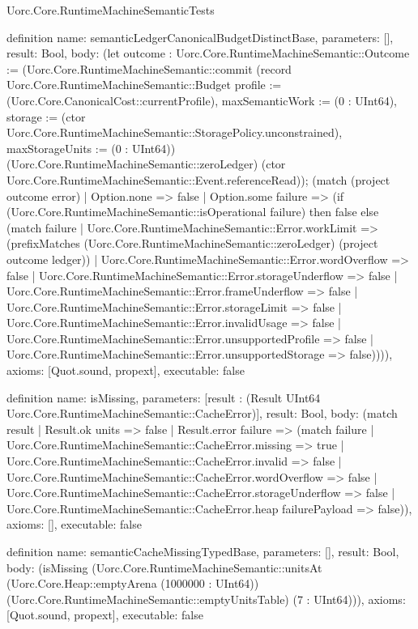 \begin{lexlean}{Uorc.Core.RuntimeMachineSemanticTests}
\begin{semanticmodule}
definition{
  name: semanticLedgerCanonicalBudgetDistinctBase,
  parameters: [],
  result: Bool,
  body: (let outcome : Uorc.Core.RuntimeMachineSemantic::Outcome := (Uorc.Core.RuntimeMachineSemantic::commit (record Uorc.Core.RuntimeMachineSemantic::Budget {profile := (Uorc.Core.CanonicalCost::currentProfile), maxSemanticWork := (0 : UInt64), storage := (ctor Uorc.Core.RuntimeMachineSemantic::StoragePolicy.unconstrained), maxStorageUnits := (0 : UInt64)}) (Uorc.Core.RuntimeMachineSemantic::zeroLedger) (ctor Uorc.Core.RuntimeMachineSemantic::Event.referenceRead)); (match (project outcome error)
    | Option.none => false
    | Option.some failure => (if (Uorc.Core.RuntimeMachineSemantic::isOperational failure) then false else (match failure
      | Uorc.Core.RuntimeMachineSemantic::Error.workLimit => (prefixMatches (Uorc.Core.RuntimeMachineSemantic::zeroLedger) (project outcome ledger))
      | Uorc.Core.RuntimeMachineSemantic::Error.wordOverflow => false
      | Uorc.Core.RuntimeMachineSemantic::Error.storageUnderflow => false
      | Uorc.Core.RuntimeMachineSemantic::Error.frameUnderflow => false
      | Uorc.Core.RuntimeMachineSemantic::Error.storageLimit => false
      | Uorc.Core.RuntimeMachineSemantic::Error.invalidUsage => false
      | Uorc.Core.RuntimeMachineSemantic::Error.unsupportedProfile => false
      | Uorc.Core.RuntimeMachineSemantic::Error.unsupportedStorage => false)))),
  axioms: [Quot.sound, propext],
  executable: false
}

definition{
  name: isMissing,
  parameters: [result : (Result UInt64 Uorc.Core.RuntimeMachineSemantic::CacheError)],
  result: Bool,
  body: (match result
    | Result.ok units => false
    | Result.error failure => (match failure
      | Uorc.Core.RuntimeMachineSemantic::CacheError.missing => true
      | Uorc.Core.RuntimeMachineSemantic::CacheError.invalid => false
      | Uorc.Core.RuntimeMachineSemantic::CacheError.wordOverflow => false
      | Uorc.Core.RuntimeMachineSemantic::CacheError.storageUnderflow => false
      | Uorc.Core.RuntimeMachineSemantic::CacheError.heap failurePayload => false)),
  axioms: [],
  executable: false
}

definition{
  name: semanticCacheMissingTypedBase,
  parameters: [],
  result: Bool,
  body: (isMissing (Uorc.Core.RuntimeMachineSemantic::unitsAt (Uorc.Core.Heap::emptyArena (1000000 : UInt64)) (Uorc.Core.RuntimeMachineSemantic::emptyUnitsTable) (7 : UInt64))),
  axioms: [Quot.sound, propext],
  executable: false
}


\end{semanticmodule}
\end{lexlean}
